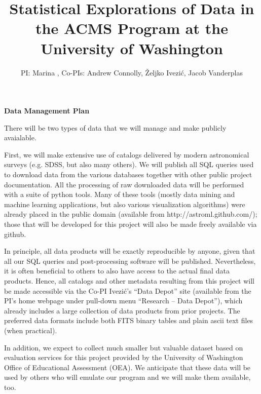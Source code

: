 \documentclass[nofootbib,floatfix,11pt]{article}
\title{Statistical Explorations of Data in the {ACMS} {Program} at the {University} of {Washington}}
\author{PI: Marina \meila, Co-PIs: Andrew Connolly, \v{Z}eljko Ivezi\'{c}, Jacob Vanderplas}
\begin{document}
\centerline{\large \bf Data Management Plan}

There will be two types of data that we will manage and make publicly avaialable.

First, we will make extensive use of catalogs delivered by modern astronomical
surveys (e.g. SDSS, but also many others). We will publish all SQL queries used to 
download data from the various databases together with other public project documentation.
All the processing of raw downloaded data will be performed with a suite of python
tools. Many of these tools (mostly data mining and machine learning applications,
but also various visualization algorithms) were already placed in the public domain 
(available from http://astroml.github.com/); those that will be developed for
this project will also be made freely available via github. 

In principle, all data products will be exactly reproducible by anyone, given that all
our SQL queries and post-processing software will be published. Nevertheless, it is 
often beneficial to others to also have access to the actual final data products. Hence,
all catalogs and other metadata resulting from this project will be made accessible via 
the Co-PI Ivezi\'{c}'s ``Data Depot'' site (available from the PI's home webpage under 
pull-down menu ``Research -- Data Depot''),  which already includes a large collection 
of data products from prior projects. The preferred data formats include both FITS binary 
tables and plain ascii text files (when practical). 

In addition, we expect to collect much smaller but valuable dataset based on evaluation 
services for this project provided by the University of Washington Office of Educational 
Assessment (OEA). We anticipate that these data will be used by others who will emulate
our program and we will make them available, too.
\end{document}
